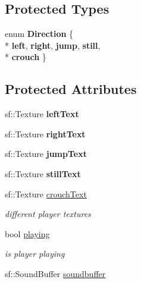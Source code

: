 \subsection*{Protected Types}
\begin{DoxyCompactItemize}
\item 
enum {\bfseries Direction} \{ \\*
{\bfseries left}, 
{\bfseries right}, 
{\bfseries jump}, 
{\bfseries still}, 
\\*
{\bfseries crouch}
 \}
\end{DoxyCompactItemize}
\subsection*{Protected Attributes}
\begin{DoxyCompactItemize}
\item 
\hypertarget{class_player_a5696d1d82851cd6dfd5dbe68b76bfdb1}{sf\-::\-Texture {\bfseries left\-Text}}\label{class_player_a5696d1d82851cd6dfd5dbe68b76bfdb1}

\item 
\hypertarget{class_player_a75ea81350746d65f2290eb487ed648e3}{sf\-::\-Texture {\bfseries right\-Text}}\label{class_player_a75ea81350746d65f2290eb487ed648e3}

\item 
\hypertarget{class_player_a304268d8b7f798b2970f815a33d8abe5}{sf\-::\-Texture {\bfseries jump\-Text}}\label{class_player_a304268d8b7f798b2970f815a33d8abe5}

\item 
\hypertarget{class_player_a5a930a925138d2fbaae4b1da90fb6894}{sf\-::\-Texture {\bfseries still\-Text}}\label{class_player_a5a930a925138d2fbaae4b1da90fb6894}

\item 
\hypertarget{class_player_aac16f632a3e1a8de17e9c8769edf207b}{sf\-::\-Texture \hyperlink{class_player_aac16f632a3e1a8de17e9c8769edf207b}{crouch\-Text}}\label{class_player_aac16f632a3e1a8de17e9c8769edf207b}

\begin{DoxyCompactList}\small\item\em different player textures \end{DoxyCompactList}\item 
\hypertarget{class_player_a93eaebe50e6ab8a19c35138b4c60f60c}{bool \hyperlink{class_player_a93eaebe50e6ab8a19c35138b4c60f60c}{playing}}\label{class_player_a93eaebe50e6ab8a19c35138b4c60f60c}

\begin{DoxyCompactList}\small\item\em is player playing \end{DoxyCompactList}\item 
\hypertarget{class_player_ad50788f8294f0f7acfd03f056f460679}{sf\-::\-Sound\-Buffer \hyperlink{class_player_ad50788f8294f0f7acfd03f056f460679}{soundbuffer}}\label{class_player_ad50788f8294f0f7acfd03f056f460679}


\end{DoxyCompactItemize}
